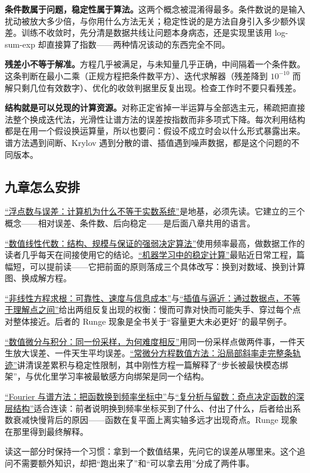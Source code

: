 \textbf{条件数属于问题，稳定性属于算法。}这两个概念被混淆得最多。条件数说的是输入扰动被放大多少倍，与你用什么方法无关；稳定性说的是方法自身引入多少额外误差。训练不收敛时，先分清是数据共线让问题本身病态，还是实现里该用 log-sum-exp 却直接算了指数——两种情况该动的东西完全不同。

\textbf{残差小不等于解准。}方程几乎被满足，与未知量几乎正确，中间隔着一个条件数。这条判断在最小二乘（正规方程把条件数平方）、迭代求解器（残差降到 \(10^{-10}\) 而解只剩几位有效数字）、优化的收敛判据里反复出现。检查工作时不要只看残差。

\textbf{结构就是可以兑现的计算资源。}对称正定省掉一半运算与全部选主元，稀疏把直接法整个换成迭代法，光滑性让谱方法的误差按指数而非多项式下降。每次利用结构都是在用一个假设换运算量，所以也要问：假设不成立时会以什么形式暴露出来。谱方法遇到间断、Krylov 遇到分散的谱、插值遇到噪声数据，都是这个问题的不同版本。

\subsection{九章怎么安排}

\hyperref[ch:061]{``浮点数与误差：计算机为什么不等于实数系统''}是地基，必须先读。它建立的三个概念——相对误差、条件数、后向稳定——是后面八章共用的语言。

\hyperref[ch:065]{``数值线性代数：结构、规模与保证的强弱决定算法''}使用频率最高，做数据工作的读者几乎每天在间接使用它的结论。\hyperref[ch:067]{``机器学习中的稳定计算''}最贴近日常工程，篇幅短，可以提前读——它把前面的原则落成三个具体改写：换到对数域、换到计算图、换成解方程。

\hyperref[ch:062]{``非线性方程求根：可靠性、速度与信息成本''}与\hyperref[ch:063]{``插值与逼近：通过数据点，不等于理解点之间''}给出两组反复出现的权衡：慢而可靠对快而可能失手、穿过每个点对整体接近。后者的 Runge 现象是全书关于``容量更大未必更好''的最早例子。

\hyperref[ch:064]{``数值微分与积分：同一份采样，为何难度相反''}用同一份采样点做两件事，一件天生放大误差、一件天生平均误差。\hyperref[ch:066]{``常微分方程数值方法：沿局部斜率走完整条轨迹''}讲清误差累积与稳定性限制，其中刚性方程一篇解释了``步长被最快模态绑架''，与优化里学习率被最敏感方向绑架是同一个结构。

\hyperref[ch:068]{``Fourier 与谱方法：把函数换到频率坐标中''}与\hyperref[ch:069]{``复分析与留数：奇点决定函数的深层结构''}适合连读：前者说明换到频率坐标买到了什么、付出了什么，后者给出系数衰减快慢背后的原因——函数在复平面上离实轴多远才出现奇点。Runge 现象在那里得到最终解释。

读这一部分时保持一个习惯：拿到一个数值结果，先问它的误差从哪里来。这个追问不需要额外知识，却把``跑出来了''和``可以拿去用''分成了两件事。
